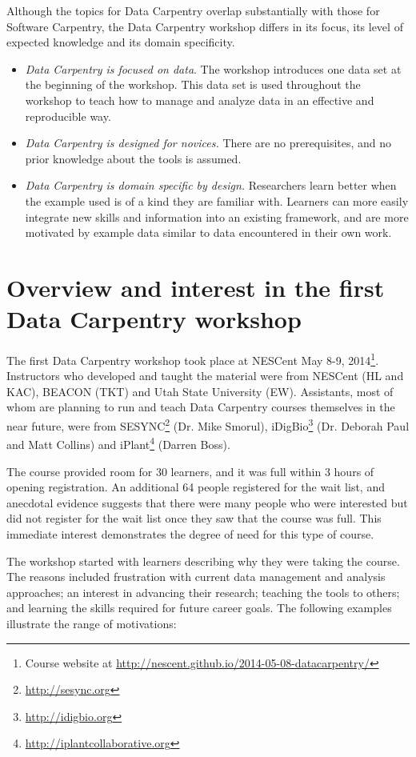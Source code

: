 \documentclass[11pt]{article}
\begin{document}
Although the topics for Data Carpentry overlap substantially with
those for Software Carpentry, the Data Carpentry workshop differs in
its focus, its level of expected knowledge and its domain specificity.
\begin{itemize}
\item \emph{Data Carpentry is focused on data}. The workshop introduces one data set at the beginning of the
workshop. This data set is used throughout the workshop to teach how to manage and analyze data in an effective and reproducible way.
\item \emph{Data Carpentry is designed for novices.} There are no prerequisites, and no 
prior knowledge about the tools is assumed.
\item \emph{Data Carpentry is domain specific by design.} Researchers learn better when the example used is
of a kind they are familiar with. Learners can more easily integrate new skills and information into an existing framework, and 
are more motivated by example data similar to data encountered in their own work.
\end{itemize}

\section{Overview and interest in the first Data Carpentry workshop}

The first Data Carpentry workshop took place at NESCent May 8-9, 2014\footnote{Course website at \url{http://nescent.github.io/2014-05-08-datacarpentry/}}. Instructors who developed and taught the material were from NESCent
(HL and KAC), BEACON (TKT) and Utah State University (EW). Assistants, most of whom are planning to run and teach Data Carpentry courses themselves in the near future, were  from SESYNC\footnote{\url{http://sesync.org}} (Dr. Mike Smorul), iDigBio\footnote{\url{http://idigbio.org}} (Dr. Deborah Paul
and Matt Collins) and iPlant\footnote{\url{http://iplantcollaborative.org}} (Darren Boss).

The course provided room for 30 learners, and it was full within 3 hours of opening registration. An additional 64 people registered for the wait list, and anecdotal evidence suggests that there were many people who were interested but did not register for the wait list once they saw that the course was full. This immediate interest demonstrates the degree of need for this type of course.

The workshop started with learners describing why they were taking the course. The reasons included frustration with current data management and analysis approaches; an interest in advancing their research; teaching the tools to others; and learning the skills required for future career goals. The following examples illustrate the range of motivations:
\end{document}
